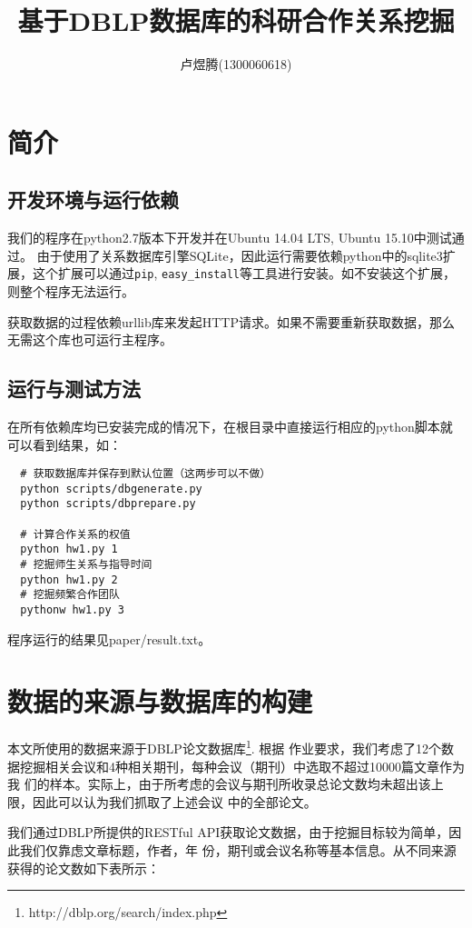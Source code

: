 \documentclass[a4paper]{article}
\title{基于DBLP数据库的科研合作关系挖掘}
\author{ 卢煜腾(1300060618)}
\begin{document}
\maketitle

\section{简介} 
\subsection{开发环境与运行依赖}
我们的程序在python2.7版本下开发并在Ubuntu 14.04 LTS, Ubuntu 15.10中测试通过。
由于使用了关系数据库引擎SQLite，因此运行需要依赖python中的sqlite3扩展，这个扩展可以通过\texttt{pip},
\texttt{easy\_install}等工具进行安装。如不安装这个扩展，则整个程序无法运行。

获取数据的过程依赖urllib库来发起HTTP请求。如果不需要重新获取数据，那么无需这个库也可运行主程序。

\subsection{运行与测试方法}
在所有依赖库均已安装完成的情况下，在根目录中直接运行相应的python脚本就可以看到结果，如：
\begin{verbatim}
  # 获取数据库并保存到默认位置（这两步可以不做）
  python scripts/dbgenerate.py
  python scripts/dbprepare.py

  # 计算合作关系的权值
  python hw1.py 1
  # 挖掘师生关系与指导时间
  python hw1.py 2
  # 挖掘频繁合作团队
  pythonw hw1.py 3
\end{verbatim}
程序运行的结果见paper/result.txt。

\section{数据的来源与数据库的构建}
本文所使用的数据来源于DBLP论文数据库\footnote{http://dblp.org/search/index.php}. 根据
作业要求，我们考虑了12个数据挖掘相关会议和4种相关期刊，每种会议（期刊）中选取不超过10000篇文章作为我
们的样本。实际上，由于所考虑的会议与期刊所收录总论文数均未超出该上限，因此可以认为我们抓取了上述会议
中的全部论文。

我们通过DBLP所提供的RESTful API获取论文数据，由于挖掘目标较为简单，因此我们仅靠虑文章标题，作者，年
份，期刊或会议名称等基本信息。从不同来源获得的论文数如下表所示：
\end{document}
